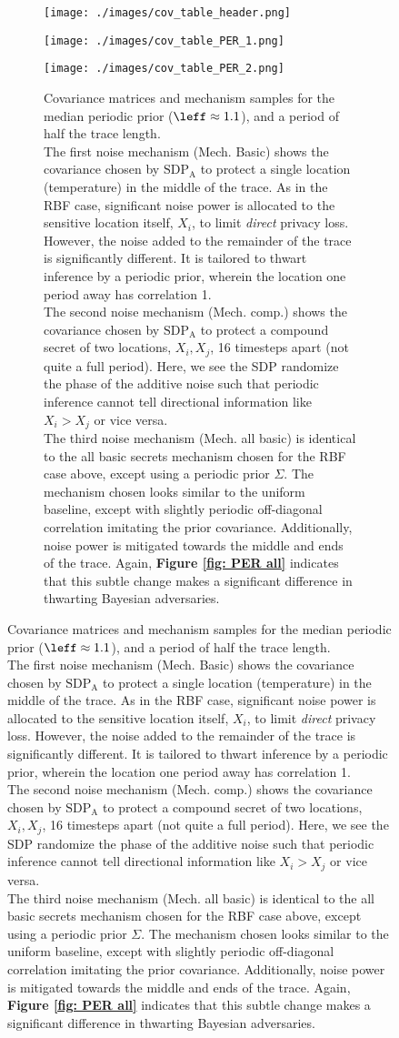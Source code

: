 \begin{figure*}[h] \ContinuedFloat
	\begin{subfigure}[b]{1\textwidth}
		\centering
		\texttt{[image: ./images/cov\_table\_header.png]}
	\end{subfigure}
	\begin{subfigure}[b]{1\textwidth}
		\centering
		\texttt{[image: ./images/cov\_table\_PER\_1.png]}
	\end{subfigure}
	\begin{subfigure}[b]{1\textwidth}
		\centering
		\texttt{[image: ./images/cov\_table\_PER\_2.png]}
		\caption{
			Covariance matrices and mechanism samples for the median periodic prior ($\leff \approx 1.1$), and a period of half the trace length. 
			\vspace{2mm} \\
			The first noise mechanism (Mech. Basic) shows the covariance chosen by $\text{SDP}_\text{A}$ to protect a single location (temperature) in the middle of the trace. As in the RBF case, significant noise power is allocated to the sensitive location itself, $X_i$, to limit \emph{direct} privacy loss. However, the noise added to the remainder of the trace is significantly different. It is tailored to thwart inference by a periodic prior, wherein the location one period away has correlation 1. 
			\vspace{2mm}\\
			The second noise mechanism (Mech. comp.) shows the covariance chosen by $\text{SDP}_\text{A}$ to protect a compound secret of two locations, $X_i, X_j$, 16 timesteps apart (not quite a full period). Here, we see the SDP randomize the phase of the additive noise such that periodic inference cannot tell directional information like $X_i > X_j$ or vice versa. 
			\vspace{2mm}\\
			The third noise mechanism (Mech. all basic) is identical to the all basic secrets mechanism chosen for the RBF case above, except using a periodic prior $\Sigma$. The mechanism chosen looks similar to the uniform baseline, except with slightly periodic off-diagonal correlation imitating the prior covariance. Additionally, noise power is mitigated towards the middle and ends of the trace. Again, \textbf{Figure \ref{fig: PER all}} indicates that this subtle change makes a significant difference in thwarting Bayesian adversaries. 
			}
		\label{fig: cov table rbf}
	\end{subfigure}
\end{figure*}

